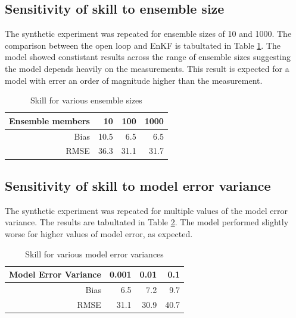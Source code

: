 \documentclass[fleqn, letterpaper]{amsart}
\begin{document}
\subsection{Sensitivity of skill to ensemble size}
The synthetic experiment was repeated for ensemble sizes of 10 and 1000. The comparison between the open loop and EnKF is tabultated in Table \ref{ensize}. The model showed constistant results across the range of ensemble sizes suggesting the model depends heavily on the measurements. This result is expected for a model with errer an order of magnitude higher than the measurement.
\begin{table}
\begin{tabular}{rrrr}
Ensemble members & 10 & 100 & 1000 \\
\hline
Bias & 10.5 & 6.5 & 6.5 \\
RMSE & 36.3 & 31.1 & 31.7
\end{tabular}
\label{ensize}
\caption{Skill for various ensemble sizes}
\end{table}

\subsection{Sensitivity of skill to model error variance}
The synthetic experiment was repeated for multiple values of the model error variance. The results are tabultated in Table \ref{error}. The model performed slightly worse for higher values of model error, as expected.
\begin{table}
\begin{tabular}{rrrr}
Model Error Variance & 0.001 & 0.01 & 0.1 \\
\hline
Bias & 6.5 & 7.2 & 9.7\\
RMSE & 31.1 & 30.9 & 40.7
\end{tabular}
\caption{Skill for various model error variances}
\label{error}
\end{table}





\end{document}

